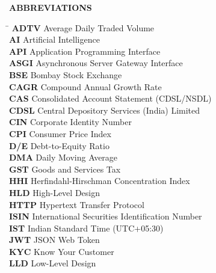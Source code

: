 \documentclass[12pt, a4paper, openright, twoside]{report}
\begin{document}
\listoffigures
{}
\cleardoublepage

\listoftables
{}
\cleardoublepage

\begin{center}
\textbf{{\huge ABBREVIATIONS}}
\vspace{0.5cm}

\begin{tabbing}
    \hspace*{3cm} \= \kill
    \textbf{ADTV} \> Average Daily Traded Volume \\
    \textbf{AI} \> Artificial Intelligence \\
    \textbf{API} \> Application Programming Interface \\
    \textbf{ASGI} \> Asynchronous Server Gateway Interface \\
    \textbf{BSE} \> Bombay Stock Exchange \\
    \textbf{CAGR} \> Compound Annual Growth Rate \\
    \textbf{CAS} \> Consolidated Account Statement (CDSL/NSDL) \\
    \textbf{CDSL} \> Central Depository Services (India) Limited \\
    \textbf{CIN} \> Corporate Identity Number \\
    \textbf{CPI} \> Consumer Price Index \\
    \textbf{D/E} \> Debt-to-Equity Ratio \\
    \textbf{DMA} \> Daily Moving Average \\
    \textbf{GST} \> Goods and Services Tax \\
    \textbf{HHI} \> Herfindahl-Hirschman Concentration Index \\
    \textbf{HLD} \> High-Level Design \\
    \textbf{HTTP} \> Hypertext Transfer Protocol \\
    \textbf{ISIN} \> International Securities Identification Number \\
    \textbf{IST} \> Indian Standard Time (UTC+05:30) \\
    \textbf{JWT} \> JSON Web Token \\
    \textbf{KYC} \> Know Your Customer \\
    \textbf{LLD} \> Low-Level Design \\

\end{tabbing}
\end{center}
\end{document}

